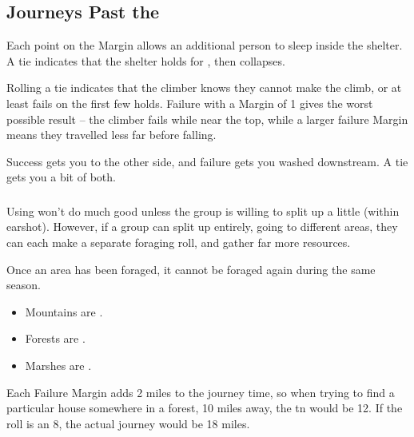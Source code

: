 \begin{multicols}{2}
\columnbreak

\subsection{Journeys Past the }

Each point on the Margin allows an additional person to sleep inside the shelter.
A tie indicates that the shelter holds for , then collapses.


Rolling a tie indicates that the climber knows they cannot make the climb, or at least fails on the first few holds.
Failure with a Margin of 1 gives the worst possible result -- the climber fails while near the top, while a larger failure Margin means they travelled less far before falling.

Success gets you to the other side, and failure gets you washed downstream.
A tie gets you a bit of both.

\subsubsection{}

Using  won't do much good unless the group is willing to split up a little (within earshot).
However, if a group can split up entirely, going to different areas, they can each make a separate foraging roll, and gather far more resources.

Once an area has been foraged, it cannot be foraged again during the same season.


\begin{itemize}
  \item
    Mountains are \tn[8].
  \item
    Forests are \tn[11].
  \item
    Marshes are \tn[12].
\end{itemize}

\noindent
Each Failure Margin adds 2 miles to the journey time, so when trying to find a particular house somewhere in a forest, 10 miles away, the \gls{tn} would be 12.
If the roll is an 8, the actual journey would be 18 miles.


\end{multicols}
